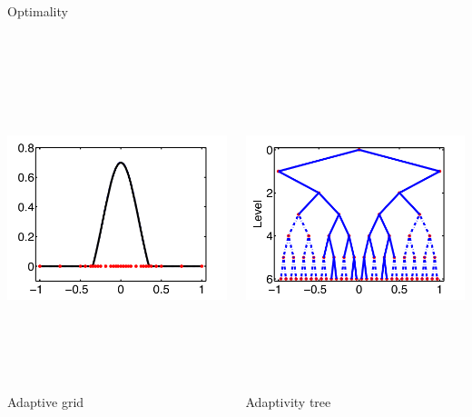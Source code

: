 \documentclass[final]{beamer}
\begin{document}
\begin{frame}{}
{\begin{columns}[t]
\begin{column}{.30\linewidth}
\begin{block}{\centering Optimality}
\begin{columns}[T]
\begin{column}{16cm}{}
\centering \includegraphics[height=10cm, width = 16cm]{figures/1Dadaptivefunc}\\
\centering \scriptsize{Adaptive grid}
\end{column}
\begin{column}{16cm}{}
\raggedleft \includegraphics[height=10cm, width = 16cm]{figures/1Dadaptivetree}\\
\centering \scriptsize{Adaptivity tree}
\end{column}
\end{columns}


\end{block}
\end{column}
\end{columns}}
\end{frame}
\end{document}
